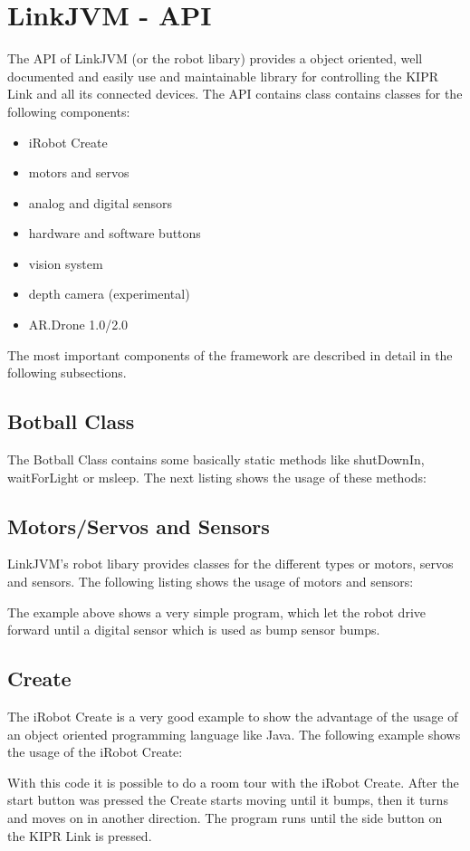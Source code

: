 \documentclass{juniorjournal}
\begin{document}
\section{LinkJVM - API}
The API of LinkJVM (or the robot libary) provides a object oriented, well documented and easily use and maintainable library for controlling the KIPR\cite{KIPR} Link\cite{link}
 and all its connected devices.
The API contains class contains classes for the following components:
\begin{itemize}
	\item iRobot Create\cite{create}
	\item motors and servos
	\item analog and digital sensors
	\item hardware and software buttons
	\item vision system
	\item depth camera (experimental)
	\item AR.Drone 1.0/2.0\cite{ar.drone}
\end{itemize}
The most important components of the framework are described in detail in the following subsections.

\subsection{Botball Class}
The Botball\cite{Botball} Class contains some basically static methods like shutDownIn, 
waitForLight or msleep.
The next listing shows the usage of these methods:


\subsection{Motors/Servos and Sensors}
LinkJVM's robot libary provides classes for the different types or motors, servos and sensors.
The following listing shows the usage of motors and sensors:

The example above shows a very simple program, which let the robot drive forward 
until a digital sensor which is used as bump sensor bumps.

\subsection{Create}
The iRobot Create\cite{create} is a very good example to show the advantage of the usage of 
an object oriented programming language like Java\cite{Java}.
The following example shows the usage of the iRobot Create\cite{create}:

With this code it is possible to do a room tour with the iRobot Create\cite{create}.
After the start button was pressed the Create\cite{create} starts moving until it bumps, then 
it turns and moves on in another direction. The program runs until the side 
button on the KIPR\cite{KIPR} Link\cite{link} is pressed.
\end{document}
